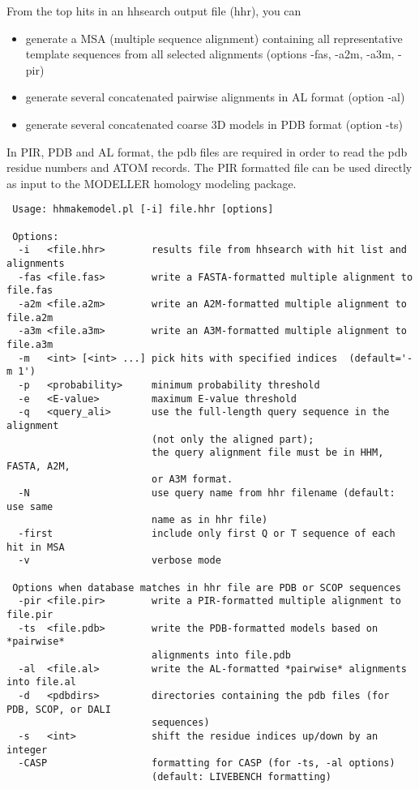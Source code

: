 \documentclass[11pt,a4paper]{article}
\begin{document}
From the top hits in an hhsearch output file (hhr), you can  
\begin{itemize}
\item{generate a MSA (multiple sequence alignment) containing all representative 
template sequences from all selected alignments (options -fas, -a2m, -a3m, -pir)}
\item{generate several concatenated pairwise alignments in AL format (option -al)}
\item{generate several concatenated coarse 3D models in PDB format (option -ts)}
\end{itemize}
In PIR, PDB and AL format, the pdb files are required in order to read the pdb residue numbers 
and ATOM records. The PIR formatted file can be used directly as input to the MODELLER\cite{Sali:1993} 
homology modeling package.

\small 
\begin{verbatim}
 Usage: hhmakemodel.pl [-i] file.hhr [options]

 Options:
  -i   <file.hhr>        results file from hhsearch with hit list and alignments
  -fas <file.fas>        write a FASTA-formatted multiple alignment to file.fas
  -a2m <file.a2m>        write an A2M-formatted multiple alignment to file.a2m
  -a3m <file.a3m>        write an A3M-formatted multiple alignment to file.a3m
  -m   <int> [<int> ...] pick hits with specified indices  (default='-m 1')
  -p   <probability>     minimum probability threshold     
  -e   <E-value>         maximum E-value threshold      
  -q   <query_ali>       use the full-length query sequence in the alignment 
                         (not only the aligned part);
                         the query alignment file must be in HHM, FASTA, A2M,  
                         or A3M format.
  -N                     use query name from hhr filename (default: use same  
                         name as in hhr file)
  -first                 include only first Q or T sequence of each hit in MSA
  -v                     verbose mode

 Options when database matches in hhr file are PDB or SCOP sequences
  -pir <file.pir>        write a PIR-formatted multiple alignment to file.pir 
  -ts  <file.pdb>        write the PDB-formatted models based on *pairwise*  
                         alignments into file.pdb
  -al  <file.al>         write the AL-formatted *pairwise* alignments into file.al
  -d   <pdbdirs>         directories containing the pdb files (for PDB, SCOP, or DALI  
                         sequences)
  -s   <int>             shift the residue indices up/down by an integer           
  -CASP                  formatting for CASP (for -ts, -al options) 
                         (default: LIVEBENCH formatting)
\end{verbatim} 
\normalsize
\end{document}
